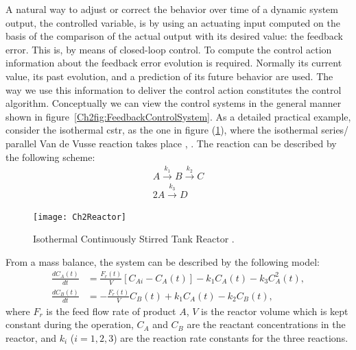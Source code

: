 A natural way to adjust or correct the behavior over time of a dynamic system output, the controlled variable, is by using an actuating input computed on the basis of the comparison of the actual output with its desired value: the feedback error. This is, by means of closed-loop control. To compute the control action information about the feedback error evolution is required. Normally its current value, its past evolution, and a prediction of its future behavior are used. The way we use this information to deliver the control action constitutes the control algorithm. Conceptually we can view the control systems in the general manner shown in figure~\ref{Ch2fig:FeedbackControlSystem}. As a detailed  practical example, consider the isothermal \gls{cstr}, as the one in figure (\ref{Ch2fig:CSTR}), where the isothermal series/ parallel Van de Vusse reaction takes place \citep{arrietaETFA2008}, \citep{VandeVusse2}. The reaction can be described by the following scheme:
%
\begin{align}
    A \overset{k_1}{\longrightarrow} B \overset{k_2}{\longrightarrow}C\\
    2 A \overset{k_3}{\longrightarrow} D \nonumber
\end{align}
%
%
\begin{figure}[t]
	\centering
	\texttt{[image: Ch2Reactor]}
	\caption{Isothermal Continuously Stirred Tank Reactor .} 
	\label{Ch2fig:CSTR}
\end{figure}

From a mass balance, the system can be described by the following model:
%
\begin{align}
    \frac{dC_A(t)}{dt} & = \frac{F_r(t)}{V} \left[C_{Ai}-C_A(t)\right] - k_1 C_A(t) - k_3 C^2_A(t),\nonumber \\
    \frac{dC_B(t)}{dt} & = -\frac{F_r(t)}{V} C_B(t)+ k_1 C_A(t) - k_2 C_B(t),
    \label{Ch2eq:system3}
\end{align}
%
where $F_r$ is the feed flow rate of product $A$, $V$ is the reactor volume which is kept constant during the operation, $C_A$ and $C_B$ are the reactant concentrations in the reactor, and $k_i$ ($i=1,2,3$) are the reaction rate constants for the three reactions.

